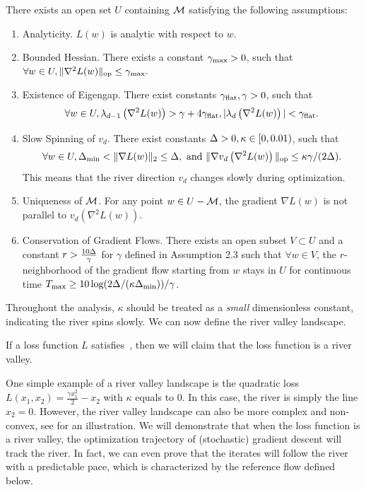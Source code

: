 \begin{assumption}
\label{assum:technical}
    There exists an open set $U$ containing $\mathcal{M}$ satisfying the following assumptions:
    \begin{enumerate}[leftmargin=*]
        \item {Analyticity.} $L(w)$ is analytic with respect to $w$.
        \item {Bounded Hessian.}  There exists a constant $\gamma_{\mathrm{max}} > 0$, such that $\forall w \in U, \| \nabla^2 L(w) \|_{\textup{op}} \le \gamma_{\mathrm{max}}.$
        \item {Existence of Eigengap.} There exist constants $\gamma_{\mathrm{flat}}, \gamma > 0$, such that $$\forall w \in U, \lambda_{d - 1}\left(\nabla^2 L(w)\right) > \gamma + 4 \gamma_{\mathrm{flat}}, |\lambda_{d}\left(\nabla^2 L(w)\right)| < \gamma_{\mathrm{flat}}.$$
            \vspace{-0.2in}
        \item  {Slow Spinning of $v_d$.} There exist constants $\Delta > 0, \kappa \in [0, 0.01)$, such that $$\forall w \in U, \Delta_{\min} < \| \nabla L(w) \|_2 \le \Delta, \textup{ and } \| \nabla  v_{d}\left( \nabla^2 L(w)\right) \|_{\textup{op}}  \le \kappa \gamma/(2\Delta).$$
        This means that the river direction $v_d$ changes slowly during optimization.
        \item {Uniqueness of $\mathcal{M}$.} For any point $w \in U - \mathcal{M}$, the gradient $\nabla L(w)$ is not parallel to $v_d(\nabla^2 L(w))$.
        \item {Conservation of Gradient Flows.} There exists an open subset $V \subset U$ and  a constant $r > \frac{10 \Delta}{\gamma}$ for $\gamma$ defined in Assumption 2.3 such that $\forall w \in V$, the $r$-neighborhood of the gradient flow starting from $w$ stays in $U$ for continuous time $T_{\mathrm{max}} \ge {10 \log(2 \Delta/ (\kappa\Delta_{\min}))}/{\gamma}$.
    \end{enumerate}
\end{assumption}


Throughout the analysis, $\kappa$ should be treated as a \emph{small} {dimensionless} constant, indicating the river spins slowly. We can now define the river valley landscape.
\begin{definition}
\label{def:river-valley}
If a loss function $L$ satisfies~, then we will claim that the loss function is a river valley.
\end{definition}

One simple example of a river valley landscape is the quadratic loss $L(x_1, x_2) = \frac{\gamma x_1^2}{2} - x_2$ with $\kappa$ equals to $0$. In this case, the river is simply the line $x_2 = 0$. However, the river valley landscape can also be more complex and non-convex, see  for an illustration.
We will demonstrate that when the loss function is a river valley, the optimization trajectory of (stochastic) gradient descent will track the river. In fact, we can even  prove that the iterates will follow the river with a predictable pace, which is characterized by the reference flow defined below.


